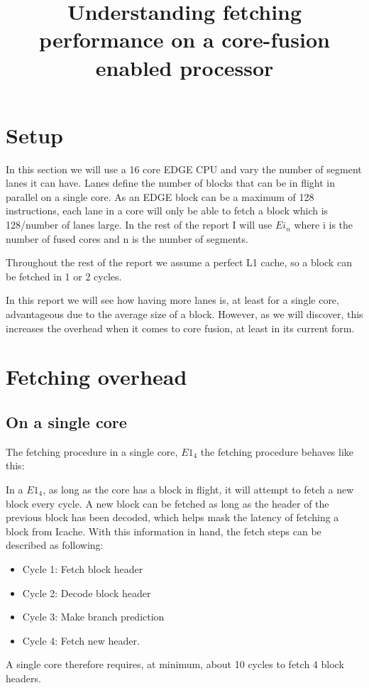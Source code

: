 

\title{Understanding fetching performance on a core-fusion enabled processor}

\section{Setup}
In this section we will use a 16 core EDGE CPU and vary the number of segment lanes it can have.
Lanes define the number of blocks that can be in flight in parallel on a single core.
As an EDGE block can be a maximum of 128 instructions, each lane in a core will only be able to fetch a block which is 128/number of lanes large.
In the rest of the report I will use $E\textit{i}_n$ where i is the number of fused cores and n is the number of segments.

Throughout the rest of the report we assume a perfect L1 cache, so a block can be fetched in 1 or 2 cycles.

In this report we will see how having more lanes is, at least for a single core, advantageous due to the average size of a block.
However, as we will discover, this increases the overhead when it comes to core fusion, at least in its current form.

\section{Fetching overhead}
\subsection{On a single core}

The fetching procedure in a single core, $E1_4$ the fetching procedure behaves like this:

In a $E1_4$, as long as the core has a block in flight, it will attempt to fetch a new block every cycle.
A new block can be fetched as long as the header of the previous block has been decoded, which helps mask the latency of fetching a block from Icache.
With this information in hand, the fetch steps can be described as following:
\begin{itemize}
\item Cycle 1: Fetch block header
\item Cycle 2: Decode block header
\item Cycle 3: Make branch prediction
\item Cycle 4: Fetch new header.
\end{itemize}
A single core therefore requires, at minimum, about 10 cycles to fetch 4 block headers.

